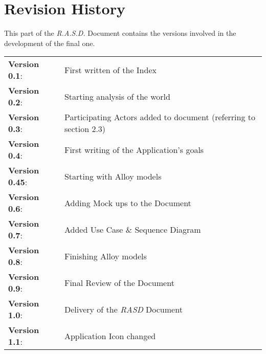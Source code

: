 \section{Revision History}

This part of the \emph{R.A.S.D.} Document contains the versions involved in the development of the final one.

\vspace{10pt}

\begin{tabular}{l l}

	\textbf{Version 0.1}:   & First written of the Index \\
    
    \textbf{Version 0.2}:   & Starting analysis of the world \\

	\textbf{Version 0.3}:   & Participating Actors added to document (referring to section 2.3)\\
    
    \textbf{Version 0.4}:   & First writing of the Application's goals\\
    
    \textbf{Version 0.45}:  & Starting with Alloy models \\
    
    \textbf{Version 0.6}:   & Adding Mock ups to the Document \\
    
    \textbf{Version 0.7}:   & Added Use Case \& Sequence Diagram \\
    
    \textbf{Version 0.8}:   & Finishing Alloy models\\
    
    \textbf{Version 0.9}:   & Final Review of the Document \\
    
    \large{\textbf{Version 1.0}}:   & Delivery of the \emph{RASD} Document \\
    
    \textbf{Version 1.1}:   & Application Icon changed \\

\end{tabular}